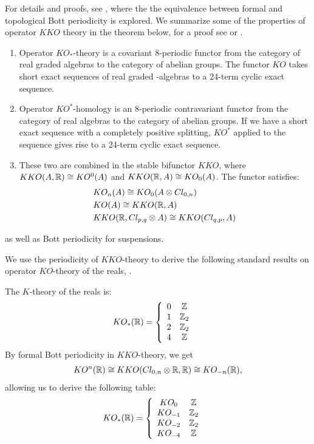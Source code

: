 For details and proofs, see \cite{kasparov}, where the the equivalence between formal and topological Bott periodicity is explored. 
We summarize some of the properties of operator $KKO$ theory in the theorem below, for a proof see \cite{kasparov} or \cite{schroder}.
\begin{theorem}
\begin{enumerate}
\item
	Operator $KO_{*}$-theory is a covariant $8$-periodic functor from the category of real graded \Cstar algebras to the category of abelian groups. The functor $KO$ takes short exact sequences of real graded \Cstar-algebras to a 24-term cyclic exact sequence. 
\item	Operator $KO^{*}$-homology is an $8$-periodic contravariant functor from the category of real \Cstar algebras to the category of abelian groups. If we have a short exact sequence with a completely positive splitting, $KO^{*}$ applied to the sequence gives rise to a 24-term cyclic exact sequence. 
	\item These two are combined in the stable bifunctor $KKO$, where $KKO(A,\mathbb{R})\cong KO^{0}(A)$ and $KKO(\mathbb{R},A)\cong KO_0(A)$. The functor satisfies:
	\begin{align*}
		&KO_n(A)\cong KO_0(A\otimes Cl_{0,n}) \\
		&KO(A)\cong KKO(\mathbb{R},A) \\
		&KKO(\mathbb{R},Cl_{p,q} \otimes A) \cong KKO(Cl_{q,p},A) 
	\end{align*}
	\end{enumerate}
	as well as Bott periodicity for suspensions. 
\end{theorem}
We use the periodicity of $KKO$-theory to derive the following standard results on operator $KO$-theory of the reals, \cite[Section 1]{schroder}. 
\begin{example}
	The $K$-theory of the reals is: 
	\begin{align*}
		&KO_*(\mathbb{R})=\left \{\begin{array}{c c} 0 & \mathbb{Z}  \\ 1 & \mathbb{Z}_2 \\ 2 & \mathbb{Z}_2 \\  4 & \mathbb{Z}\end{array} \right .
	\end{align*}
	By formal Bott periodicity in $KKO$-theory, we get \begin{align*}KO^n(\mathbb{R})\cong KKO(Cl_{0,n}\otimes \mathbb{R},\mathbb{R})\cong KO_{-n}(\mathbb{R}), \end{align*} allowing us to derive the following table:
	\begin{align*}
		&KO_*(\mathbb{R})=\left \{ \begin{array}{c c} KO_0 & \mathbb{Z}  \\ KO_{-1} & \mathbb{Z}_2 \\ KO_{-2} & \mathbb{Z}_2 \\ KO_{-4} & \mathbb{Z} \end{array} \right .
	\end{align*}
\end{example}
